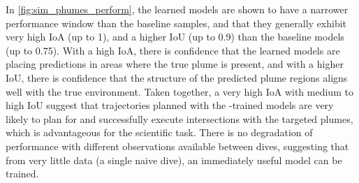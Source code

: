 In \cref{fig:sim_phumes_perform}, the learned models are shown to have a narrower performance window than the baseline samples, and that they generally exhibit very high IoA (up to 1), and a higher IoU (up to 0.9) than the baseline models (up to 0.75). With a high IoA, there is confidence that the learned models are placing predictions in areas where the true plume is present, and with a higher IoU, there is confidence that the structure of the predicted plume regions aligns well with the true environment. Taken together, a very high IoA with medium to high IoU suggest that trajectories planned with the \PHORTEX-trained models are very likely to plan for and successfully execute intersections with the targeted plumes, which is advantageous for the scientific task. There is no degradation of performance with different observations available between dives, suggesting that from very little data (a single naive dive), an immediately useful model can be trained.

